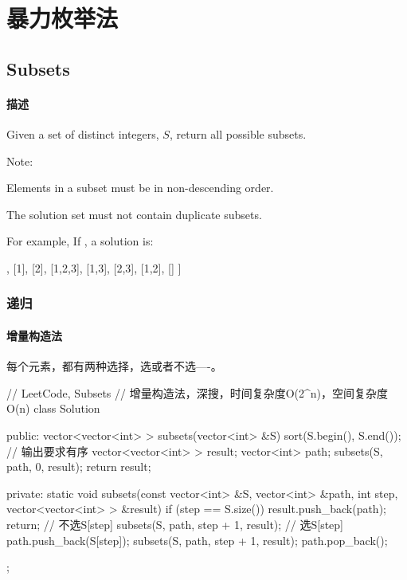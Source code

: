 \chapter{暴力枚举法}


\section{Subsets} %
\label{sec:subsets}


\subsubsection{描述}
Given a set of distinct integers, $S$, return all possible subsets.

Note:
\begindot
\item Elements in a subset must be in non-descending order.
\item The solution set must not contain duplicate subsets.
\myenddot

For example, If , a solution is:
\begin{Code}
[
  [3],
  [1],
  [2],
  [1,2,3],
  [1,3],
  [2,3],
  [1,2],
  []
]
\end{Code}


\subsection{递归}


\subsubsection{增量构造法}
每个元素，都有两种选择，选或者不选----。

\begin{Code}
// LeetCode, Subsets
// 增量构造法，深搜，时间复杂度O(2^n)，空间复杂度O(n)
class Solution {
public:
    vector<vector<int> > subsets(vector<int> &S) {
        sort(S.begin(), S.end());  // 输出要求有序
        vector<vector<int> > result;
        vector<int> path;
        subsets(S, path, 0, result);
        return result;
    }

private:
    static void subsets(const vector<int> &S, vector<int> &path, int step,
            vector<vector<int> > &result) {
        if (step == S.size()) {
            result.push_back(path);
            return;
        }
        // 不选S[step]
        subsets(S, path, step + 1, result);
        // 选S[step]
        path.push_back(S[step]);
        subsets(S, path, step + 1, result);
        path.pop_back();
    }
};
\end{Code}


